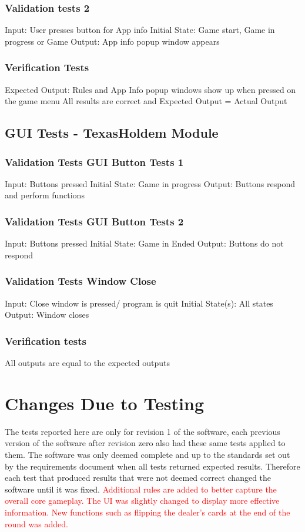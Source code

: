 \documentclass[11pt]{article}
\begin{document}
\subsubsection{Validation tests 2}
Input: User presses button for App info 
Initial State: Game start, Game in progress or Game 
Output: App info popup window appears

\subsubsection{Verification Tests}
Expected Output: Rules and App Info popup windows show up when pressed on the game menu
All results are correct and Expected Output = Actual Output

\subsection{GUI Tests - TexasHoldem Module}

\subsubsection{Validation Tests GUI Button Tests 1}
Input: Buttons pressed
Initial State: Game in progress
Output: Buttons respond and perform functions
 
\subsubsection{Validation Tests GUI Button Tests 2}
Input: Buttons pressed
Initial State: Game in Ended
Output: Buttons do not respond

\subsubsection{Validation Tests Window Close}
Input: Close window is pressed/ program is quit
Initial State(s): All states 
Output: Window closes

\subsubsection{Verification tests}
All outputs are equal to the expected outputs

	\section{Changes Due to Testing}
	The tests reported here are only for revision 1 of the software, each previous version of the software after revision zero also had these same tests applied to them. The software was only deemed complete and up to the standards set out by the requirements document when all tests returned expected results. Therefore each test that produced results that were not deemed correct changed the software until it was fixed. \textcolor{red}{Additional rules are added to better capture the overall core gameplay. The UI was slightly changed to display more effective information. New functions such as flipping the dealer's cards at the end of the round was added. }
\end{document}
